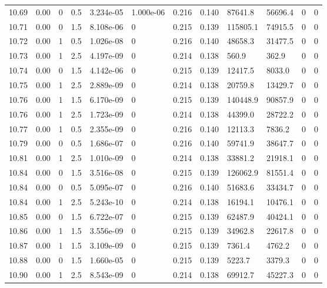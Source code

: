\documentclass[preview]{standalone}
\begin{document}
{{{{{{{{{{{{{{{{{{{\begin{tabular}{L{1.2cm}C{1.2cm} C{0.3cm}C{0.5cm} C{1.4cm}C{1.4cm} C{1.4cm}C{1.4cm} C{1.6cm}C{1.6cm} C{1.6cm}C{1.6cm}}
  10.69  &  0.00  & 0     & 0.5 &  3.234e-05  & 1.000e-06  &  0.216&   0.140& 87641.8 & 56696.4   &  0 & 0  \\ 
  10.71  &  0.00  & 0     & 1.5 &  8.108e-06  & 0  &  0.215&   0.139& 115805.1 & 74915.5   &  0 & 0  \\ 
  10.72  &  0.00  & 1     & 0.5 &  1.026e-08  & 0  &  0.216&   0.140& 48658.3 & 31477.5   &  0 & 0  \\ 
  10.73  &  0.00  & 1     & 2.5 &  4.197e-09  & 0  &  0.214&   0.138& 560.9 & 362.9   &  0 & 0  \\ 
  10.74  &  0.00  & 0     & 1.5 &  4.142e-06  & 0  &  0.215&   0.139& 12417.5 & 8033.0   &  0 & 0  \\ 
  10.75  &  0.00  & 1     & 2.5 &  2.889e-09  & 0  &  0.214&   0.138& 20759.8 & 13429.7   &  0 & 0  \\ 
  10.76  &  0.00  & 1     & 1.5 &  6.170e-09  & 0  &  0.215&   0.139& 140448.9 & 90857.9   &  0 & 0  \\ 
  10.76  &  0.00  & 1     & 2.5 &  1.723e-09  & 0  &  0.214&   0.138& 44399.0 & 28722.2   &  0 & 0  \\ 
  10.77  &  0.00  & 1     & 0.5 &  2.355e-09  & 0  &  0.216&   0.140& 12113.3 & 7836.2   &  0 & 0  \\ 
  10.79  &  0.00  & 0     & 0.5 &  1.686e-07  & 0  &  0.216&   0.140& 59741.9 & 38647.7   &  0 & 0  \\ 
  10.81  &  0.00  & 1     & 2.5 &  1.010e-09  & 0  &  0.214&   0.138& 33881.2 & 21918.1   &  0 & 0  \\ 
  10.84  &  0.00  & 0     & 1.5 &  3.516e-08  & 0  &  0.215&   0.139& 126062.9 & 81551.4   &  0 & 0  \\ 
  10.84  &  0.00  & 0     & 0.5 &  5.095e-07  & 0  &  0.216&   0.140& 51683.6 & 33434.7   &  0 & 0  \\ 
  10.84  &  0.00  & 1     & 2.5 &  5.243e-10  & 0  &  0.214&   0.138& 16194.1 & 10476.1   &  0 & 0  \\ 
  10.85  &  0.00  & 0     & 1.5 &  6.722e-07  & 0  &  0.215&   0.139& 62487.9 & 40424.1   &  0 & 0  \\ 
  10.86  &  0.00  & 1     & 1.5 &  3.556e-09  & 0  &  0.215&   0.139& 34962.8 & 22617.8   &  0 & 0  \\ 
  10.87  &  0.00  & 1     & 1.5 &  3.109e-09  & 0  &  0.215&   0.139& 7361.4 & 4762.2   &  0 & 0  \\ 
  10.88  &  0.00  & 0     & 1.5 &  1.660e-05  & 0  &  0.215&   0.139& 5223.7 & 3379.3   &  0 & 0  \\ 
  10.90  &  0.00  & 1     & 2.5 &  8.543e-09  & 0  &  0.214&   0.138& 69912.7 & 45227.3   &  0 & 0  \\ 

\end{tabular}}}}}}}}}}}}}}}}}}}}
\end{document}
